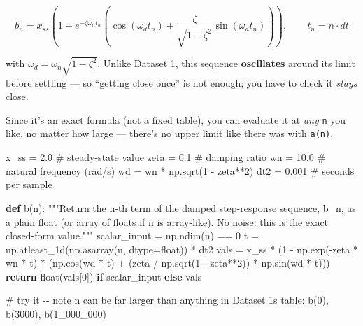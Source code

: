 \documentclass[
  letterpaper,
  DIV=11,
  numbers=noendperiod]{scrreprt}
\newenvironment{Shaded}{\begin{snugshade}}{\end{snugshade}}
\newcommand{\BuiltInTok}[1]{\textcolor[rgb]{0.00,0.23,0.31}{#1}}
\newcommand{\CommentTok}[1]{\textcolor[rgb]{0.37,0.37,0.37}{#1}}
\newcommand{\ControlFlowTok}[1]{\textcolor[rgb]{0.00,0.23,0.31}{\textbf{#1}}}
\newcommand{\DecValTok}[1]{\textcolor[rgb]{0.68,0.00,0.00}{#1}}
\newcommand{\FloatTok}[1]{\textcolor[rgb]{0.68,0.00,0.00}{#1}}
\newcommand{\KeywordTok}[1]{\textcolor[rgb]{0.00,0.23,0.31}{\textbf{#1}}}
\newcommand{\NormalTok}[1]{\textcolor[rgb]{0.00,0.23,0.31}{#1}}
\newcommand{\OperatorTok}[1]{\textcolor[rgb]{0.37,0.37,0.37}{#1}}
\theoremstyle{plain}
\theoremstyle{plain}
\theoremstyle{definition}
\theoremstyle{definition}
\theoremstyle{definition}
\theoremstyle{plain}
\theoremstyle{plain}
\theoremstyle{remark}
\begin{document}
\[ b_n = x_{ss}\left(1 - e^{-\zeta \omega_n t_n}\left(\cos(\omega_d t_n) +
\frac{\zeta}{\sqrt{1-\zeta^2}}\sin(\omega_d t_n)\right)\right), \qquad t_n = n \cdot dt \]

with \(\omega_d = \omega_n\sqrt{1-\zeta^2}\). Unlike Dataset 1, this
sequence \textbf{oscillates} around its limit before settling --- so
``getting close once'' is not enough; you have to check it \emph{stays}
close.

Since it's an exact formula (not a fixed table), you can evaluate it at
\emph{any} \texttt{n} you like, no matter how large --- there's no upper
limit like there was with \texttt{a(n)}.

\begin{Shaded}
\begin{Highlighting}[]
\NormalTok{x\_ss }\OperatorTok{=} \FloatTok{2.0}     \CommentTok{\# steady{-}state value}
\NormalTok{zeta }\OperatorTok{=} \FloatTok{0.1}     \CommentTok{\# damping ratio}
\NormalTok{wn }\OperatorTok{=} \FloatTok{10.0}      \CommentTok{\# natural frequency (rad/s)}
\NormalTok{wd }\OperatorTok{=}\NormalTok{ wn }\OperatorTok{*}\NormalTok{ np.sqrt(}\DecValTok{1} \OperatorTok{{-}}\NormalTok{ zeta}\OperatorTok{**}\DecValTok{2}\NormalTok{)}
\NormalTok{dt2 }\OperatorTok{=} \FloatTok{0.001}    \CommentTok{\# seconds per sample}

\KeywordTok{def}\NormalTok{ b(n):}
    \CommentTok{"""Return the n{-}th term of the damped step{-}response sequence, b\_n, as a}
\CommentTok{    plain float (or array of floats if n is array{-}like). No noise: this is}
\CommentTok{    the exact closed{-}form value."""}
\NormalTok{    scalar\_input }\OperatorTok{=}\NormalTok{ np.ndim(n) }\OperatorTok{==} \DecValTok{0}
\NormalTok{    t }\OperatorTok{=}\NormalTok{ np.atleast\_1d(np.asarray(n, dtype}\OperatorTok{=}\BuiltInTok{float}\NormalTok{)) }\OperatorTok{*}\NormalTok{ dt2}
\NormalTok{    vals }\OperatorTok{=}\NormalTok{ x\_ss }\OperatorTok{*}\NormalTok{ (}\DecValTok{1} \OperatorTok{{-}}\NormalTok{ np.exp(}\OperatorTok{{-}}\NormalTok{zeta }\OperatorTok{*}\NormalTok{ wn }\OperatorTok{*}\NormalTok{ t) }\OperatorTok{*}
\NormalTok{                    (np.cos(wd }\OperatorTok{*}\NormalTok{ t) }\OperatorTok{+}\NormalTok{ (zeta }\OperatorTok{/}\NormalTok{ np.sqrt(}\DecValTok{1} \OperatorTok{{-}}\NormalTok{ zeta}\OperatorTok{**}\DecValTok{2}\NormalTok{)) }\OperatorTok{*}\NormalTok{ np.sin(wd }\OperatorTok{*}\NormalTok{ t)))}
    \ControlFlowTok{return} \BuiltInTok{float}\NormalTok{(vals[}\DecValTok{0}\NormalTok{]) }\ControlFlowTok{if}\NormalTok{ scalar\_input }\ControlFlowTok{else}\NormalTok{ vals}

\CommentTok{\# try it {-}{-} note n can be far larger than anything in Dataset 1\textquotesingle{}s table:}
\NormalTok{b(}\DecValTok{0}\NormalTok{), b(}\DecValTok{3000}\NormalTok{), b(}\DecValTok{1\_000\_000}\NormalTok{)}
\end{Highlighting}
\end{Shaded}
\end{document}
